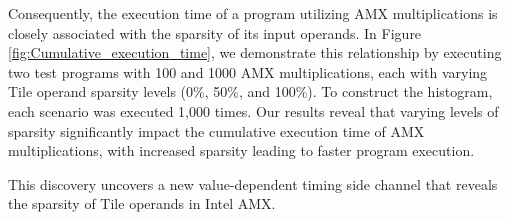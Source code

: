 Consequently, the execution time of a program utilizing AMX multiplications is closely associated with the sparsity of its input operands. In Figure \ref{fig:Cumulative_execution_time}, we demonstrate this relationship by executing two test programs with 100 and 1000 AMX multiplications, each with varying Tile operand sparsity levels (0\%, 50\%, and 100\%). To construct the histogram, each scenario was executed 1,000 times. Our results reveal that varying levels of sparsity significantly impact the cumulative execution time of AMX multiplications, with increased sparsity leading to faster program execution.

This discovery uncovers a new value-dependent timing side channel that reveals the sparsity of Tile operands in Intel AMX.

